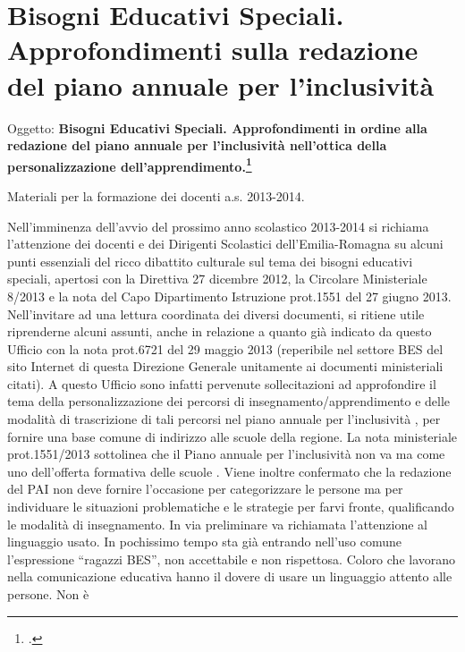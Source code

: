 \chapter{Bisogni Educativi Speciali. Approfondimenti sulla redazione del piano annuale per l'inclusività }

Oggetto: \textbf{ Bisogni Educativi Speciali. Approfondimenti in ordine alla redazione del piano
annuale per l'inclusività nell'ottica della personalizzazione dell'apprendimento.\footcite{USRperLEmiliaRomagna2013a}}

Materiali per la formazione dei docenti a.s. 2013-2014.

Nell'imminenza dell'avvio del prossimo anno scolastico 2013-2014 si richiama l'attenzione dei docenti
e dei Dirigenti Scolastici dell'Emilia-Romagna su alcuni punti essenziali del ricco dibattito culturale sul
tema dei bisogni educativi speciali, apertosi con la Direttiva 27 dicembre 2012, la Circolare Ministeriale
8/2013 e la nota del Capo Dipartimento Istruzione prot.1551 del 27 giugno 2013.
Nell'invitare ad una lettura coordinata dei diversi documenti, si ritiene utile riprenderne alcuni assunti,
anche in relazione a quanto già indicato da questo Ufficio con la nota prot.6721 del 29 maggio 2013
(reperibile nel settore BES del sito Internet di questa Direzione Generale unitamente ai documenti
ministeriali citati).
A questo Ufficio sono infatti pervenute sollecitazioni ad approfondire il tema della personalizzazione
dei percorsi di insegnamento/apprendimento e delle modalità di trascrizione di tali percorsi nel piano
annuale per l'inclusività , per fornire una base comune di indirizzo alle scuole della regione.
La nota ministeriale prot.1551/2013 sottolinea che il Piano annuale per l'inclusività non va
 ma come uno
 dell'offerta formativa delle scuole .
Viene inoltre confermato che la redazione del PAI non deve fornire l'occasione per categorizzare le
persone ma per individuare le situazioni problematiche e le strategie per farvi fronte, qualificando le
modalità di insegnamento.
In via preliminare va richiamata l'attenzione al linguaggio usato. In pochissimo tempo sta già entrando
nell'uso comune l'espressione “ragazzi BES”, non accettabile e non rispettosa. Coloro che lavorano
nella comunicazione educativa hanno il dovere di usare un linguaggio attento alle persone. Non è
